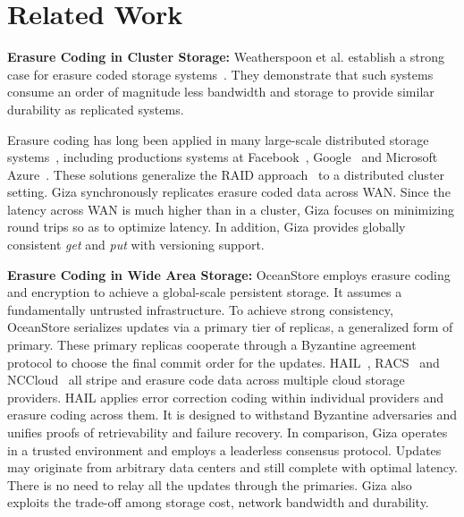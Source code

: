 \section{Related Work}


{\bf Erasure Coding in Cluster Storage:}
Weatherspoon et al. establish a strong case for erasure coded storage
systems~\cite{weatherspoon02erasure}. They demonstrate that such systems consume
an order of magnitude less bandwidth and storage to provide similar durability
as replicated systems.

Erasure coding has long been applied in many large-scale distributed storage
systems~\cite{fab:asplos04, zhang04repstore, haeberlen05glacier, abd05ursa,
  welch08scalable, sathiamoorthy13xoring, zhang16efficient}, including
productions systems at Facebook~\cite{borthakur2010hdfs},
Google~\cite{fikes2010storage, ford10availability} and Microsoft
Azure~\cite{huang12erasure}. These solutions generalize the RAID
approach~\cite{patterson88case, wilkes96hp} to a distributed cluster setting.
Giza synchronously replicates erasure coded data across WAN. Since the latency
across WAN is much higher than in a cluster, Giza focuses on minimizing round
trips so as to optimize latency. In addition, Giza provides globally consistent
{\em get} and {\em put} with versioning support.

{\bf Erasure Coding in Wide Area Storage:}
OceanStore \cite{oceanstore:asplos00, pond:fast13} employs erasure coding and
encryption to achieve a global-scale persistent storage. It assumes a
fundamentally untrusted infrastructure. To achieve strong consistency,
OceanStore serializes updates via a primary tier of replicas, a generalized form
of primary. These primary replicas cooperate through a Byzantine agreement
protocol to choose the final commit order for the updates. 
HAIL~\cite{hail:ccs09}, RACS~\cite{racs:socc10} and
NCCloud~\cite{nccloud:fast12} all stripe and erasure code data across multiple
cloud storage providers. HAIL applies error correction coding within individual
providers and erasure coding across them. It is designed to withstand Byzantine
adversaries and unifies proofs of retrievability and failure recovery. 
In comparison, Giza operates in a trusted environment and employs a leaderless
consensus protocol. Updates may originate from arbitrary data centers and still
complete with optimal latency. There is no need to relay all the updates through
the primaries. Giza also exploits the trade-off among storage cost, network
bandwidth and durability.


